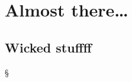 

\Clear
\chapter{Almost there\dots}
\label{cha:almost_there}

\lipsum[1]

\section{Wicked stuffff}
\label{sec:wicked_stuffff}

\S \lipsum[3]


